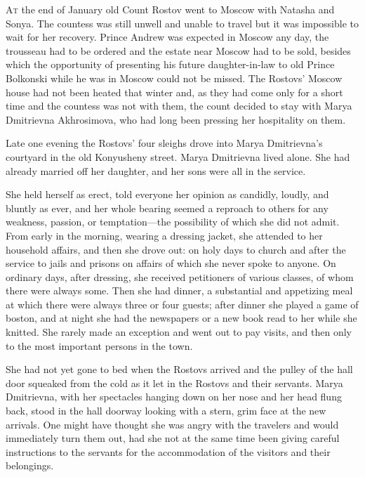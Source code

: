 \lettrine[lines=2, loversize=0.3, lraise=0]{\initfamily A}{t}
the end of January old Count Rostov went to Moscow with
Natasha and Sonya. The countess was still unwell and unable to
travel but it was impossible to wait for her recovery. Prince
Andrew was expected in Moscow any day, the trousseau had to be
ordered and the estate near Moscow had to be sold, besides which
the opportunity of presenting his future daughter-in-law to old
Prince Bolkonski while he was in Moscow could not be missed. The
Rostovs' Moscow house had not been heated that winter and, as
they had come only for a short time and the countess was not with
them, the count decided to stay with Marya Dmitrievna
Akhrosimova, who had long been pressing her hospitality on them.

Late one evening the Rostovs' four sleighs drove into Marya
Dmitrievna's courtyard in the old Konyusheny street. Marya
Dmitrievna lived alone.  She had already married off her
daughter, and her sons were all in the service.

She held herself as erect, told everyone her opinion as candidly,
loudly, and bluntly as ever, and her whole bearing seemed a
reproach to others for any weakness, passion, or temptation---the
possibility of which she did not admit. From early in the
morning, wearing a dressing jacket, she attended to her household
affairs, and then she drove out: on holy days to church and after
the service to jails and prisons on affairs of which she never
spoke to anyone. On ordinary days, after dressing, she received
petitioners of various classes, of whom there were always
some. Then she had dinner, a substantial and appetizing meal at
which there were always three or four guests; after dinner she
played a game of boston, and at night she had the newspapers or a
new book read to her while she knitted. She rarely made an
exception and went out to pay visits, and then only to the most
important persons in the town.

She had not yet gone to bed when the Rostovs arrived and the
pulley of the hall door squeaked from the cold as it let in the
Rostovs and their servants. Marya Dmitrievna, with her spectacles
hanging down on her nose and her head flung back, stood in the
hall doorway looking with a stern, grim face at the new
arrivals. One might have thought she was angry with the travelers
and would immediately turn them out, had she not at the same time
been giving careful instructions to the servants for the
accommodation of the visitors and their belongings.


